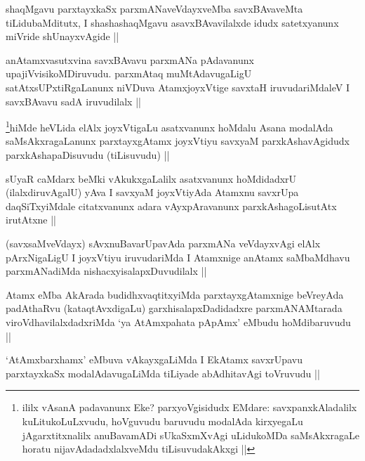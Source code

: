 \begin{artha}
shaqMgavu parxtayxkaSx parxmANaveVdayxveMba savxBAvaveMta tiLidubaMditutx, I shashashaqMgavu asavxBAvavilalxde idudx satetxyanunx miVride shUnayxvAgide ||
\end{artha}

\begin{artha}
anAtamxvasutxvina savxBAvavu parxmANa pAdavanunx upajiVvisikoMDiruvudu. parxmAtaq muMtAdavugaLigU satAtxsUPxtiRgaLanunx niVDuva AtamxjoyxVtige savxtaH iruvudariMdaleV I savxBAvavu sadA iruvudilalx ||
\end{artha}

\begin{artha}
\footnote{ililx vAsanA padavanunx Eke? parxyoVgisidudx EMdare: savxpanxkAladalilx kuLitukoLuLxvudu, hoVguvudu baruvudu modalAda kirxyegaLu jAgarxtitxnalilx anuBavamADi sUkaSxmXvAgi uLidukoMDa saMsAkxragaLe horatu nijavAdadadxlalxveMdu tiLisuvudakAkxgi ||}hiMde heVLida elAlx joyxVtigaLu asatxvanunx hoMdalu Asana modalAda saMsAkxragaLanunx parxtayxgAtamx joyxVtiyu savxyaM parxkAshavAgidudx parxkAshapaDisuvudu (tiLisuvudu) ||
\end{artha}

\begin{artha}
sUyaR caMdarx beMki vAkukxgaLalilx asatxvanunx hoMdidadxrU (ilalxdiruvAgalU) yAva I savxyaM joyxVtiyAda Atamxnu savxrUpa daqSiTxyiMdale citatxvanunx adara vAyxpAravanunx parxkAshagoLisutAtx irutAtxne ||
\end{artha}

\begin{artha}
(savxsaMveVdayx) sAvxnuBavarUpavAda parxmANa veVdayxvAgi elAlx pArxNigaLigU I joyxVtiyu iruvudariMda I Atamxnige anAtamx saMbaMdhavu parxmANadiMda nishacxyisalapxDuvudilalx ||
\end{artha}

\begin{artha}
Atamx eMba AkArada budidhxvaqtitxyiMda parxtayxgAtamxnige beVreyAda padAthaRvu (kataqtAvxdigaLu) garxhisalapxDadidadxre parxmANAMtarada viroVdhavilalxdadxriMda `ya AtAmx\s pahata pApAmx' eMbudu hoMdibaruvudu ||
\end{artha}

\begin{artha}
`AtAmxbarxhamx' eMbuva vAkayxgaLiMda I EkAtamx savxrUpavu parxtayxkaSx modalAdavugaLiMda tiLiyade abAdhitavAgi toVruvudu ||
\end{artha}

